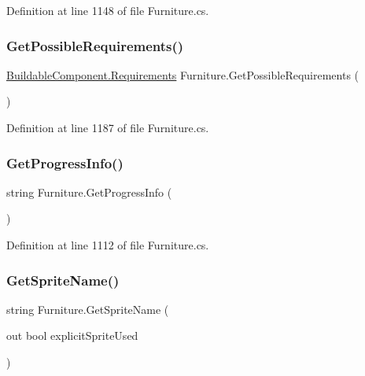 Definition at line 1148 of file Furniture.\+cs.

\mbox{\label{class_furniture_aeddb6c1525947e6517f4c27ca992c1ab}} 
\subsubsection{\texorpdfstring{Get\+Possible\+Requirements()}{GetPossibleRequirements()}}
{\footnotesize\ttfamily \hyperlink{class_project_porcupine_1_1_buildable_1_1_components_1_1_buildable_component_a331a0d67512b8b402c04c8cf31c0ca8a}{Buildable\+Component.\+Requirements} Furniture.\+Get\+Possible\+Requirements (\begin{DoxyParamCaption}{ }\end{DoxyParamCaption})}



Definition at line 1187 of file Furniture.\+cs.

\mbox{\label{class_furniture_a19a8b804f1bcf3d3b9db7e184e17b250}} 
\subsubsection{\texorpdfstring{Get\+Progress\+Info()}{GetProgressInfo()}}
{\footnotesize\ttfamily string Furniture.\+Get\+Progress\+Info (\begin{DoxyParamCaption}{ }\end{DoxyParamCaption})}



Definition at line 1112 of file Furniture.\+cs.

\mbox{\label{class_furniture_a9820e3379b92d0765131a3bbe0383c6e}} 
\subsubsection{\texorpdfstring{Get\+Sprite\+Name()}{GetSpriteName()}}
{\footnotesize\ttfamily string Furniture.\+Get\+Sprite\+Name (\begin{DoxyParamCaption}\item[{out bool}]{explicit\+Sprite\+Used }\end{DoxyParamCaption})}



